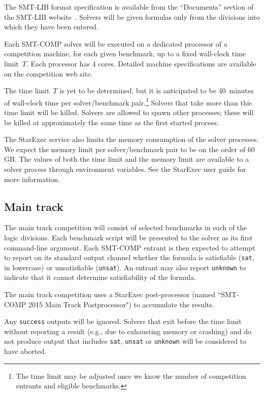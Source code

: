 \documentclass[12pt]{article}
\begin{document}
%
The SMT-LIB format specification is available from the ``Documents''
section of the SMT-LIB website~\cite{SMT-LIB}.  Solvers will be given
formulas only from the divisions into which they have been entered.

%
Each SMT-COMP solver will be executed on a dedicated processor of a
competition machine, for each given benchmark, up to a fixed
wall-clock time limit~$T$.  Each processor has 4 cores.  Detailed
machine specifications are available on the competition web site.

The time limit~$T$ is yet to be determined, but it is anticipated to
be 40~minutes of wall-clock time per solver/benchmark
pair.\footnote{The time limit may be adjusted once we know the number
  of competition entrants and eligible benchmarks.}  Solvers that take
more than this time limit will be killed.  Solvers are allowed to
spawn other processes; these will be killed at approximately the same
time as the first started process.

The StarExec service also limits the memory consumption of the solver
processes.  We expect the memory limit per solver/benchmark pair to be
on the order of 60\,GB.  The values of both the time limit and the
memory limit are available to a solver process through environment
variables.  See the StarExec user guide for more information.

\subsection{Main track}
\label{sec:exec:main}

The main track competition will consist of selected benchmarks in each
of the logic divisions.  Each benchmark script will be presented to
the solver as its first command-line argument.  Each SMT-COMP entrant
is then expected to attempt to report on its standard output channel
whether the formula is satisfiable (\texttt{sat}, in lowercase) or
unsatisfiable (\texttt{unsat}).  An entrant may also report
\texttt{unknown} to indicate that it cannot determine satisfiability
of the formula.

The main track competition uses a StarExec post-processor (named
``SMT-COMP 2015 Main Track Postprocessor") to accumulate the results.

%
Any \texttt{success} outputs will be ignored.  Solvers that exit
before the time limit without reporting a result (e.g., due to
exhausting memory or crashing) and do not produce output that includes
\texttt{sat}, \texttt{unsat} or \texttt{unknown} will be considered to
have aborted.
\end{document}
